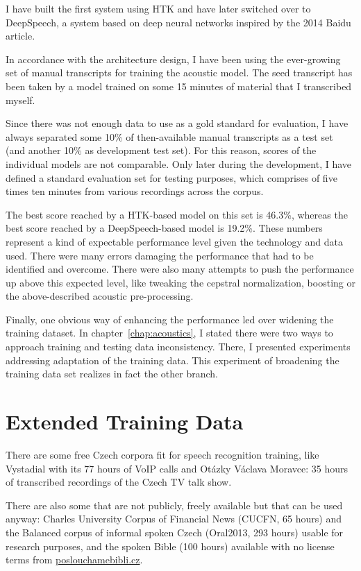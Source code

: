 \documentclass[12pt,a4paper]{report}
\begin{document}
I have built the first system using HTK and have later switched over to
DeepSpeech, a system based on deep neural networks inspired by the 2014 Baidu
article\cite{hannun2014deep}.

In accordance with the architecture design, I have been using the ever-growing
set of manual transcripts for training the acoustic model. The seed transcript
has been taken by a model trained on some 15 minutes of material that I
transcribed myself.

Since there was not enough data to use as a gold standard for evaluation, I have
always separated some 10\% of then-available manual transcripts as a test set
(and another 10\% as development test set). For this reason, scores of the
individual models are not comparable. Only later during the development, I have
defined a standard evaluation set for testing purposes, which comprises of five
times ten minutes from various recordings across the corpus.

The best score reached by a HTK-based model on this set is 46.3\%, whereas the
best score reached by a DeepSpeech-based model is 19.2\%. These numbers
represent a kind of expectable performance level given the technology and data
used. There were many errors damaging the performance that had to be identified
and overcome. There were also many attempts to push the performance up above
this expected level, like tweaking the cepstral normalization, boosting or the
above-described acoustic pre-processing.

Finally, one obvious way of enhancing the performance led over widening the
training dataset. In chapter~\ref{chap:acoustics}, I stated there were two ways
to approach training and testing data inconsistency. There, I presented
experiments addressing adaptation of the training data. This experiment of
broadening the training data set realizes in fact the other branch.

\section{Extended Training Data}
\label{sec:svolocz:svolocz}

There are some free Czech corpora fit for speech recognition training, like
Vystadial\cite{vystadialarticle} with its 77 hours of VoIP calls
and Otázky Václava Moravce: 35 hours of transcribed recordings of the
Czech TV talk show\cite{ovmdata}.

There are also some that are not publicly, freely available but that can be used
anyway: Charles University
Corpus of Financial News (CUCFN, 65 hours)\cite{byrne1999large} and the Balanced
corpus of informal spoken Czech (Oral2013, 293 hours)\cite{oral2013} usable for
research purposes, and the spoken Bible (100 hours) available with no license
terms from \url{poslouchamebibli.cz}.
\end{document}
